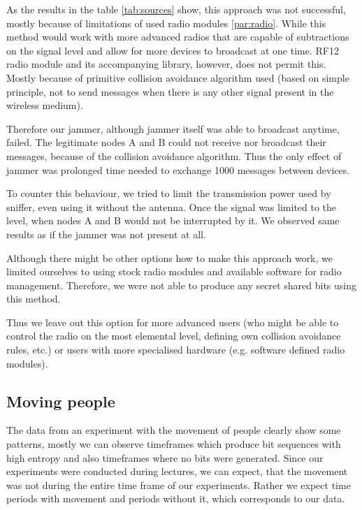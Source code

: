 \documentclass[
  print, %
  Table,   %
  nolof,     %
  nolot,     %
           oneside
]{fithesis3}
\begin{document}
  As the results in the table \ref{tab:sources} show, this approach was not successful, mostly because of limitations of used radio modules \ref{par:radio}. While this method would work with more advanced radios that are capable of subtractions on the signal level and allow for more devices to broadcast at one time. RF12 radio module and its accompanying library, however, does not permit this. Mostly because of primitive collision avoidance algorithm used (based on simple principle, not to send messages when there is any other signal present in the wireless medium).

  Therefore our jammer, although jammer itself was able to broadcast anytime, failed. The legitimate nodes A and B could not receive nor broadcast their messages, because of the collision avoidance algorithm. Thus the only effect of jammer was prolonged time needed to exchange 1000 messages between devices.

  To counter this behaviour, we tried to limit the transmission power used by sniffer, even using it without the antenna. Once the signal was limited to the level, when nodes A and B would not be interrupted by it. We observed same results as if the jammer was not present at all.

  Although there might be other options how to make this approach work, we limited ourselves to using stock radio modules and available software for radio management. Therefore, we were not able to produce any secret shared bits using this method.

  Thus we leave out this option for more advanced users (who might be able to control the radio on the most elemental level, defining own collision avoidance rules, etc.) or users with more specialised hardware (e.g. software defined radio modules).

  \subsection{Moving people}\label{src:people}
  The data from an experiment with the movement of people clearly show some patterns, mostly we can observe timeframes which produce bit sequences with high entropy and also timeframes where no bits were generated. Since our experiments were conducted during lectures, we can expect, that the movement was not during the entire time frame of our experiments. Rather we expect time periods with movement and periods without it, which corresponds to our data.
\end{document}
